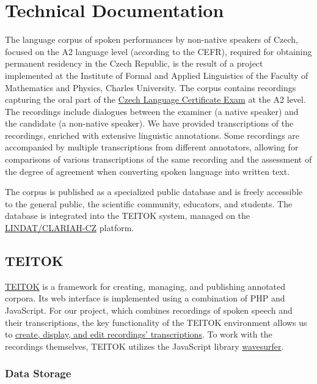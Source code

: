 \documentclass[
]{article}
\author{}
\date{}
\begin{document}
\hypertarget{technical-documentation}{%
\section{Technical Documentation}\label{technical-documentation}}

The language corpus of spoken performances by non-native speakers of
Czech, focused on the A2 language level (according to the CEFR),
required for obtaining permanent residency in the Czech Republic, is the
result of a project implemented at the Institute of Formal and Applied
Linguistics of the Faculty of Mathematics and Physics, Charles
University. The corpus contains recordings capturing the oral part of
the
\href{https://ujop.cuni.cz/UJOPEN-70.html?ujopcmsid=12:czech-language-certificate-exam-cce}{Czech
Language Certificate Exam} at the A2 level. The recordings include
dialogues between the examiner (a native speaker) and the candidate (a
non-native speaker). We have provided transcriptions of the recordings,
enriched with extensive linguistic annotations. Some recordings are
accompanied by multiple transcriptions from different annotators,
allowing for comparisons of various transcriptions of the same recording
and the assessment of the degree of agreement when converting spoken
language into written text.

The corpus is published as a specialized public database and is freely
accessible to the general public, the scientific community, educators,
and students. The database is integrated into the TEITOK system, managed
on the \href{https://lindat.cz/}{LINDAT/CLARIAH-CZ} platform.

\hypertarget{teitok}{%
\subsection{TEITOK}\label{teitok}}

\href{http://teitok.corpuswiki.org/}{TEITOK} is a framework for
creating, managing, and publishing annotated corpora. Its web interface
is implemented using a combination of PHP and JavaScript. For our
project, which combines recordings of spoken speech and their
transcriptions, the key functionality of the TEITOK environment allows
us to
\href{http://www.teitok.org/index.php?action=help\&id=wavesurfer}{create,
display, and edit recordings' transcriptions}. To work with the
recordings themselves, TEITOK utilizes the JavaScript library
\href{http://wavesurfer-js.org/}{wavesurfer}.

\hypertarget{data-storage}{%
\subsubsection{Data Storage}\label{data-storage}}
\end{document}
